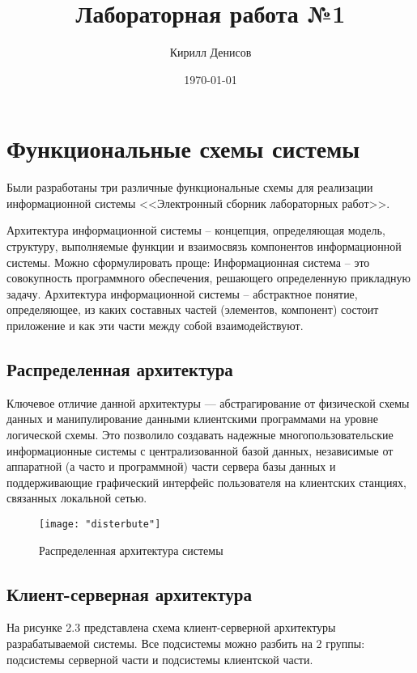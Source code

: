 \documentclass[a4paper,14pt]{extarticle}
\author{Кирилл Денисов}
\title{Лабораторная работа №1}
\date{\today}
\newcommand{\pathToCommonFolder}{/home/denilai/Documents/repos/latex/Common}
\begin{document}
	\thispagestyle{empty}
	
	\newpage
	\newpage
	
\normalsize

\section{Функциональные схемы системы}
Были разработаны три различные функциональные схемы для реализации информационной системы <<Электронный сборник лабораторных работ>>.


Архитектура информационной системы – концепция,
определяющая модель, структуру, выполняемые функции и
взаимосвязь компонентов информационной системы.
Можно сформулировать проще:
Информационная система – это совокупность программного
обеспечения, решающего определенную прикладную задачу.
Архитектура информационной системы – абстрактное
понятие, определяющее, из каких составных частей (элементов,
компонент) состоит приложение и как эти части между собой
взаимодействуют.



\subsection{Распределенная архитектура}


Ключевое отличие данной архитектуры --- абстрагирование от физической схемы данных и манипулирование
данными клиентскими программами на уровне логической схемы. Это позволило создавать надежные многопользовательские информационные системы с
централизованной базой данных, независимые от аппаратной (а
часто и программной) части сервера базы данных и поддерживающие
графический интерфейс пользователя на клиентских станциях,
связанных локальной сетью. 

\begin{figure}[h!]
	\centering
	\texttt{[image: "disterbute"]}
	\caption{Распределенная архитектура системы}
	\label{fig:disterbute}
\end{figure}


\subsection{Клиент-серверная архитектура}
На рисунке 2.3 представлена схема клиент-серверной архитектуры разрабатываемой  системы.
Все подсистемы можно разбить на 2 группы: подсистемы серверной части и подсистемы клиентской части. 
\end{document}
